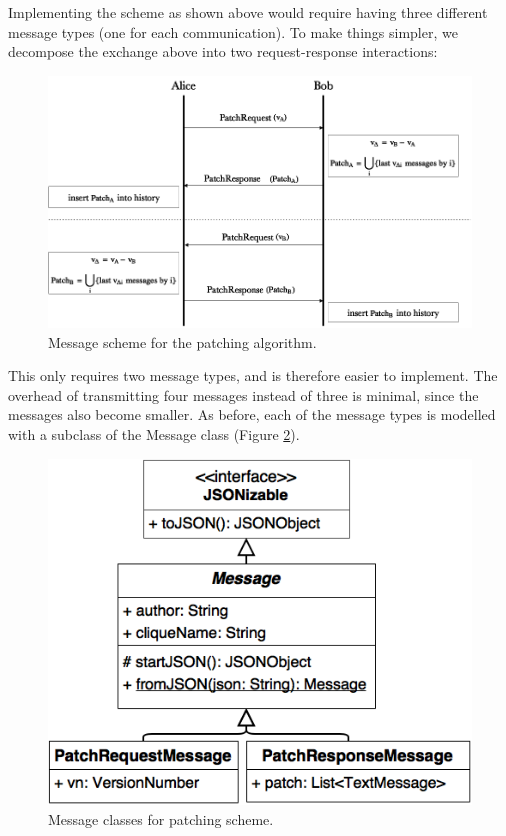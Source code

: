 \documentclass[a4paper, 12pt]{report}
\begin{document}
Implementing the scheme as shown above would require having three different message types (one for each communication). To make things simpler, we decompose the exchange above into two request-response interactions:

\begin{figure}[H]
    \captionsetup{width=0.76\textwidth}
    \centering
    \includegraphics[width=0.8\linewidth]{pics/patching_modified.png}
    \caption{\label{fig:patching_modified} Message scheme for the patching algorithm.}
\end{figure}

This only requires two message types, and is therefore easier to implement. The overhead of transmitting four messages instead of three is minimal, since the messages also become smaller. As before, each of the message types is modelled with a subclass of the Message class (Figure \ref{fig:patching_messages_uml}).

\begin{figure}[H]
    \captionsetup{width=0.76\textwidth}
    \centering
    \includegraphics[width=0.6\linewidth]{pics/patching_messages_uml.png}
    \caption{\label{fig:patching_messages_uml} Message classes for patching scheme. }
\end{figure}
\end{document}
